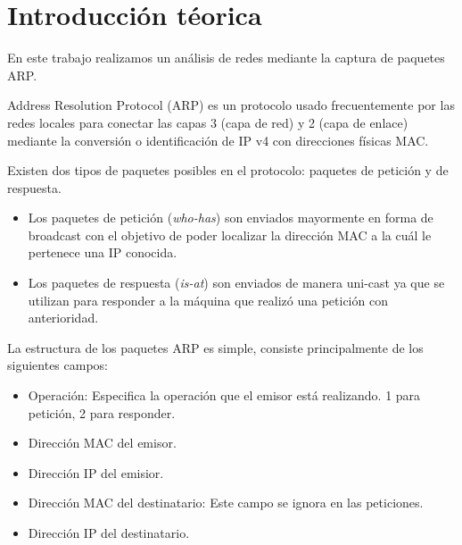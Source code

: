 \documentclass[a4paper, 10pt, twoside]{article}
\begin{document}
\newpage




\tableofcontents

\newpage




\section{Introducción téorica}

En este trabajo realizamos un análisis de redes mediante la captura de paquetes ARP.

Address Resolution Protocol (ARP) es un protocolo usado frecuentemente por las redes locales para conectar las capas 3 (capa de red) y 2 (capa de enlace) mediante la conversión o identificación de IP v4 con direcciones físicas MAC.

Existen dos tipos de paquetes posibles en el protocolo: paquetes de petición y de respuesta.

\begin{itemize}
	\item Los paquetes de petición (\textit{who-has}) son enviados mayormente en forma de broadcast con el objetivo de poder localizar la dirección MAC a la cuál le pertenece una IP conocida.
	\item Los paquetes de respuesta (\textit{is-at}) son enviados de manera uni-cast ya que se utilizan para responder a la máquina que realizó una petición con anterioridad.
\end{itemize}

La estructura de los paquetes ARP es simple, consiste principalmente de los siguientes campos:

\begin{itemize}
	\item Operación: Especifica la operación que el emisor está realizando. 1 para petición, 2 para responder.
	\item Dirección MAC del emisor.
	\item Dirección IP del emisior.
	\item Dirección MAC del destinatario: Este campo se ignora en las peticiones.
	\item Dirección IP del destinatario.
\end{itemize}
\end{document}
